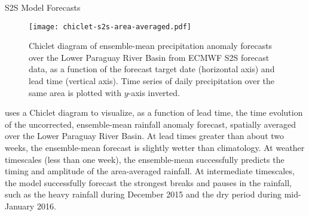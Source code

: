 \begin{block}{S2S  Model Forecasts}
  \begin{mdframed}
  \begin{figure}
    \caption{
      Chiclet diagram of ensemble-mean precipitation anomaly forecasts over the Lower Paraguay River Basin from ECMWF S2S forecast data, as a function of the forecast target date (horizontal axis) and lead time (vertical axis).
      Time series of daily precipitation over the same area is plotted with $y$-axis inverted.
  	}
    \noindent\texttt{[image: chiclet-s2s-area-averaged.pdf]}
  	\label{fig:chiclet}
  \end{figure}
  \end{mdframed}

   uses a Chiclet diagram \cite{Carbin:2016fx} to visualize, as a function of lead time, the time evolution of the uncorrected, ensemble-mean rainfall anomaly forecast, spatially averaged over the Lower Paraguay River Basin.
  At lead times greater than about two weeks, the ensemble-mean forecast is slightly wetter than climatology.
  At weather timescales (less than one week), the ensemble-mean successfully predicts the timing and amplitude of the area-averaged rainfall.
  At intermediate timescales, the model successfully forecast the strongest breaks and pauses in the rainfall, such as the heavy rainfall during December 2015 and the dry period during mid-January 2016.

  \end{block}
